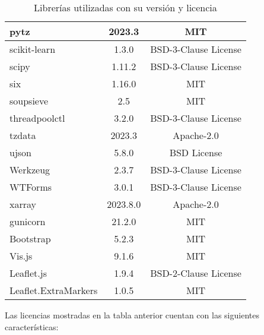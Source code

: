 \begin{table}[h!]
\begin{tabular}{|l|c|c|}
\hline
pytz & 2023.3 & MIT \\
\hline
scikit-learn & 1.3.0 & BSD-3-Clause License\\
\hline
scipy & 1.11.2 & BSD-3-Clause License\\
\hline
six & 1.16.0 & MIT \\
\hline
soupsieve & 2.5 & MIT\\
\hline
threadpoolctl & 3.2.0 & BSD-3-Clause License\\
\hline
tzdata & 2023.3 &  Apache-2.0\\
\hline
ujson & 5.8.0 & BSD License\\
\hline
Werkzeug & 2.3.7  &BSD-3-Clause License \\
\hline
WTForms & 3.0.1 & BSD-3-Clause License\\
\hline
xarray & 2023.8.0 & Apache-2.0 \\
\hline
gunicorn & 21.2.0 & MIT \\
\hline
Bootstrap & 5.2.3 & MIT \\
\hline
Vis.js & 9.1.6 & MIT \\
\hline
Leaflet.js & 1.9.4 & BSD-2-Clause License \\
\hline
Leaflet.ExtraMarkers & 1.0.5 & MIT \\
\hline
\end{tabular}
\caption{Librerías utilizadas con su versión y licencia}
\label{tab:librerias-licencias}
\end{table}

Las licencias mostradas en la tabla anterior cuentan con las siguientes características:

